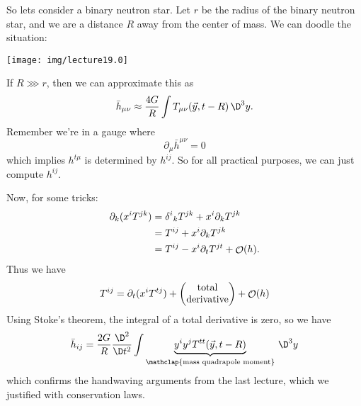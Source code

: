 
So lets consider a binary neutron star. Let $r$ be the radius of
the binary neutron star, and we are a distance $R$ away from the
center of mass. We can doodle the situation:
\begin{center}
\texttt{[image: img/lecture19.0]}
\end{center}
If $R\ggg r$, then we can approximate this as
\begin{equation}
\bar{h}_{\mu\nu} \approx\frac{4G}{R}\int
T_{\mu\nu}(\vec{y},t-R)\,\D^{3}y.
\end{equation}
Remember we're in a gauge where
\begin{equation}
\partial_{\mu}\bar{h}^{\mu\nu}=0
\end{equation}
which implies $h^{t\mu}$ is determined by $h^{ij}$. So for all
practical purposes, we can just compute $h^{ij}$.

Now, for some tricks:
\begin{equation}
\begin{split}
\partial_{k}(x^{i}T^{jk})
&={\delta^{i}}_{k}T^{jk} + x^{i}\partial_{k}T^{jk}\\
&=T^{ij} + x^{i}\partial_{k}T^{jk}\\
&=T^{ij} - x^{i}\partial_{t}T^{jt} + \mathop{\mathcal{O}}\nolimits(h).
\end{split}
\end{equation}
Thus we have
\begin{equation}
T^{ij} = \partial_{t}(x^{i}T^{tj})
+ \begin{pmatrix}\mbox{total}\\\mbox{derivative}
\end{pmatrix}
+\mathop{\mathcal{O}}\nolimits(h)
\end{equation}
Using Stoke's theorem, the integral of a total derivative is
zero, so we have
\begin{equation}
\bar{h}_{ij} = \frac{2G}{R}\frac{\D^{2}}{\D t^{2}}\int
\underbrace{y^{i}y^{j}T^{tt}(\vec{y},t-R)}_{\mathclap{\text{mass quadrapole moment}}}\,\D^{3}y
\end{equation}
which confirms the handwaving arguments from the last lecture, which
we justified with conservation laws.

